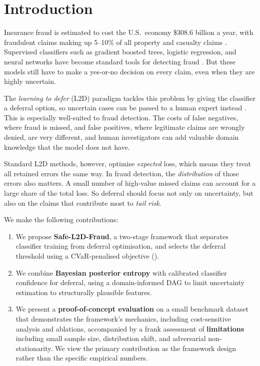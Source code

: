 \section{Introduction}
\label{sec:intro}

Insurance fraud is estimated to cost the U.S.\ economy \$308.6 billion a year, with fraudulent claims making up 5--10\% of all property and casualty claims \citep{coalition2022fraud}. Supervised classifiers such as gradient boosted trees, logistic regression, and neural networks have become standard tools for detecting fraud \citep{phua2010comprehensive}. But these models still have to make a yes-or-no decision on every claim, even when they are highly uncertain.

The \textit{learning to defer} (L2D) paradigm tackles this problem by giving the classifier a deferral option, so uncertain cases can be passed to a human expert instead \citep{madras2018predict, mozannar2020consistent}. This is especially well-suited to fraud detection. The costs of false negatives, where fraud is missed, and false positives, where legitimate claims are wrongly denied, are very different, and human investigators can add valuable domain knowledge that the model does not have.

Standard L2D methods, however, optimise \textit{expected} loss, which means they treat all retained errors the same way. In fraud detection, the \textit{distribution} of those errors also matters. A small number of high-value missed claims can account for a large share of the total loss. So deferral should focus not only on uncertainty, but also on the claims that contribute most to \textit{tail risk}.

We make the following contributions:
\begin{enumerate}
    \item We propose \textbf{Safe-L2D-Fraud}, a two-stage framework that separates classifier training from deferral optimisation, and selects the deferral threshold using a CVaR-penalised objective ().
    \item We combine \textbf{Bayesian posterior entropy} with calibrated classifier confidence for deferral, using a domain-informed DAG to limit uncertainty estimation to structurally plausible features.
    \item We present a \textbf{proof-of-concept evaluation} on a small benchmark dataset that demonstrates the framework's mechanics, including cost-sensitive analysis and ablations, accompanied by a frank assessment of \textbf{limitations} including small sample size, distribution shift, and adversarial non-stationarity. We view the primary contribution as the framework design rather than the specific empirical numbers.
\end{enumerate}